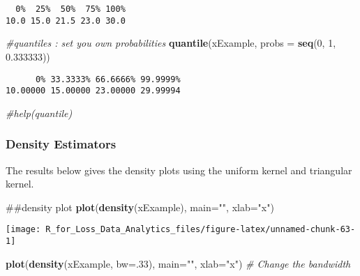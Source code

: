 \documentclass[]{book}
\newenvironment{Shaded}{\begin{snugshade}}{\end{snugshade}}
\newcommand{\KeywordTok}[1]{\textcolor[rgb]{0.13,0.29,0.53}{\textbf{#1}}}
\newcommand{\DataTypeTok}[1]{\textcolor[rgb]{0.13,0.29,0.53}{#1}}
\newcommand{\DecValTok}[1]{\textcolor[rgb]{0.00,0.00,0.81}{#1}}
\newcommand{\FloatTok}[1]{\textcolor[rgb]{0.00,0.00,0.81}{#1}}
\newcommand{\StringTok}[1]{\textcolor[rgb]{0.31,0.60,0.02}{#1}}
\newcommand{\CommentTok}[1]{\textcolor[rgb]{0.56,0.35,0.01}{\textit{#1}}}
\newcommand{\NormalTok}[1]{#1}
\theoremstyle{definition}
\theoremstyle{definition}
\theoremstyle{definition}
\theoremstyle{remark}
\begin{document}
\begin{verbatim}
  0%  25%  50%  75% 100% 
10.0 15.0 21.5 23.0 30.0 
\end{verbatim}

\begin{Shaded}
\begin{Highlighting}[]
\CommentTok{#quantiles : set you own probabilities}
\KeywordTok{quantile}\NormalTok{(xExample, }\DataTypeTok{probs =} \KeywordTok{seq}\NormalTok{(}\DecValTok{0}\NormalTok{, }\DecValTok{1}\NormalTok{, }\FloatTok{0.333333}\NormalTok{))}
\end{Highlighting}
\end{Shaded}

\begin{verbatim}
      0% 33.3333% 66.6666% 99.9999% 
10.00000 15.00000 23.00000 29.99994 
\end{verbatim}

\begin{Shaded}
\begin{Highlighting}[]
\CommentTok{#help(quantile)}
\end{Highlighting}
\end{Shaded}

\subsubsection{Density Estimators}\label{density-estimators}

The results below gives the density plots using the uniform kernel and
triangular kernel.

\begin{Shaded}
\begin{Highlighting}[]
\NormalTok{##density plot }
\KeywordTok{plot}\NormalTok{(}\KeywordTok{density}\NormalTok{(xExample), }\DataTypeTok{main=}\StringTok{""}\NormalTok{, }\DataTypeTok{xlab=}\StringTok{"x"}\NormalTok{)}
\end{Highlighting}
\end{Shaded}

\begin{center}\texttt{[image: R\_for\_Loss\_Data\_Analytics\_files/figure-latex/unnamed-chunk-63-1]} \end{center}

\begin{Shaded}
\begin{Highlighting}[]
\KeywordTok{plot}\NormalTok{(}\KeywordTok{density}\NormalTok{(xExample, }\DataTypeTok{bw=}\NormalTok{.}\DecValTok{33}\NormalTok{), }\DataTypeTok{main=}\StringTok{""}\NormalTok{, }\DataTypeTok{xlab=}\StringTok{"x"}\NormalTok{) }\CommentTok{# Change the bandwidth}
\end{Highlighting}
\end{Shaded}
\end{document}
